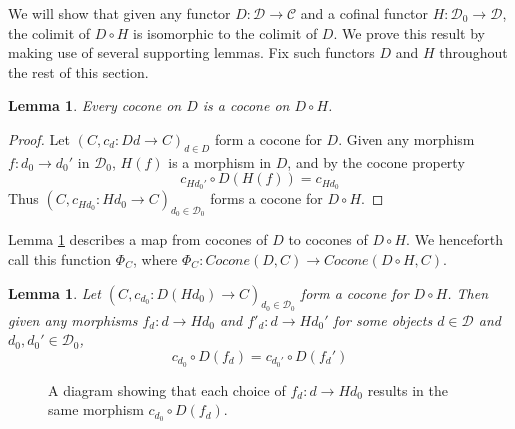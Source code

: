 \documentclass{msthesis}
\newtheorem{lemma}[theorem]{Lemma}
\theoremstyle{definition}
\newcommand{\mcC}{\mathcal{C}}
\newcommand{\mcD}{\mathcal{D}}
\newcommand{\mcDo}{\mathcal{D}_0}
\begin{document}
We will show that given any functor $D : \mcD \to \mcC$ and a cofinal functor $H : \mcD_0 \to \mcD$, the colimit of $D \circ H$ is isomorphic to the colimit of $D$.  We prove this result by making use of several supporting lemmas.  Fix such functors $D$ and $H$ throughout the rest of this section.  

\begin{lemma}\label{lemma:coconeDtoDH}
    Every cocone on $D$ is a cocone on $D \circ H$.
\end{lemma}
\begin{proof}
    Let $(C, c_d : D d \to C)_{d \in D}$ form a cocone for $D$.  Given any morphism $f : d_0 \to d_0'$ in $\mcD_0$, $H(f)$ is a morphism in $D$, and by the cocone property
    \[ c_{Hd_0'} \circ D(H(f)) = c_{Hd_0} \]
    Thus $(C, c_{Hd_0} : H d_0 \to C)_{d_0 \in \mcDo}$ forms a cocone for $D \circ H$.
\end{proof}

Lemma \ref{lemma:coconeDtoDH} describes a map from cocones of $D$ to cocones of $D \circ H$. We henceforth call this function $\Phi_C$, where $\Phi_C : Cocone(D, C) \to Cocone(D \circ H, C)$.

\begin{lemma}\label{lemma:unique_cofinal_morphism}
    Let $(C, c_{d_0} : D(H d_0) \to C)_{d_0 \in \mcDo}$ form a cocone for $D \circ H$. Then given any morphisms $f_d : d \to H d_0$ and $f'_d : d \to H d_0'$ for some objects $d \in \mcD$ and $d_0, d_0' \in \mcDo$,
    \begin{equation}\label{eq:unique_cofinal_morphism}
        c_{d_0} \circ D(f_d) = c_{d_0'} \circ D(f_{d}')
    \end{equation}
\end{lemma}

\begin{figure}[tbp]
    \centering
    \caption{A diagram showing that each choice of $f_d : d \to H d_0$ results in the same morphism $c_{d_0} \circ D(f_d)$.}
    \label{fig:cocone_DHtoD}
\end{figure}
\end{document}
